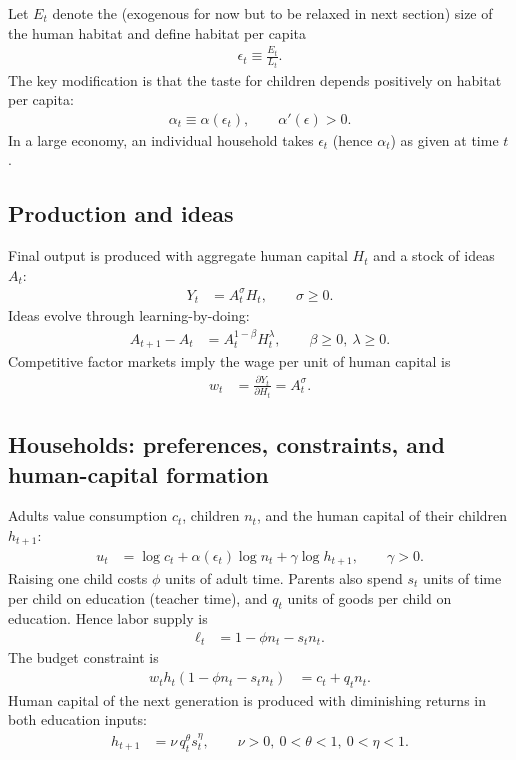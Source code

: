 \documentclass[11pt]{article}
\begin{document}
Let $E_t$ denote the (exogenous for now but to be relaxed in next section) size of the human habitat and define habitat per capita
\begin{align}
\epsilon_t \equiv \frac{E_t}{L_t}. \label{eq:eps_def}
\end{align}
The key modification is that the taste for children depends positively on habitat per capita:
\begin{align}
\alpha_t \equiv \alpha(\epsilon_t),
\qquad
\alpha'(\epsilon)>0. \label{eq:alpha_eps}
\end{align}
In a large economy, an individual household takes $\epsilon_t$ (hence $\alpha_t$) as given at time $t$.

\subsection{Production and ideas}
Final output is produced with aggregate human capital $H_t$ and a stock of ideas $A_t$:
\begin{align}
Y_t &= A_t^{\sigma} H_t, \qquad \sigma \ge 0. \label{eq:Y_hab}
\end{align}
Ideas evolve through learning-by-doing:
\begin{align}
A_{t+1}-A_t &= A_t^{1-\beta} H_t^{\lambda},
\qquad \beta \ge 0,\ \lambda \ge 0. \label{eq:Aiso_hab}
\end{align}
Competitive factor markets imply the wage per unit of human capital is
\begin{align}
w_t &= \frac{\partial Y_t}{\partial H_t}=A_t^{\sigma}. \label{eq:wage_hab}
\end{align}

\subsection{Households: preferences, constraints, and human-capital formation}
Adults value consumption $c_t$, children $n_t$, and the human capital of their children $h_{t+1}$:
\begin{align}
u_t &= \log c_t + \alpha(\epsilon_t)\log n_t + \gamma \log h_{t+1},
\qquad \gamma>0. \label{eq:util_hab}
\end{align}
Raising one child costs $\phi$ units of adult time. Parents also spend $s_t$ units of time per child on education (teacher time),
and $q_t$ units of goods per child on education. Hence labor supply is
\begin{align}
\ell_t &= 1-\phi n_t - s_t n_t. \label{eq:labor_hab}
\end{align}
The budget constraint is
\begin{align}
w_t h_t (1-\phi n_t - s_t n_t) &= c_t + q_t n_t. \label{eq:budget_hab}
\end{align}
Human capital of the next generation is produced with diminishing returns in both education inputs:
\begin{align}
h_{t+1} &= \nu\, q_t^{\theta} s_t^{\eta},
\qquad \nu>0,\ 0<\theta<1,\ 0<\eta<1. \label{eq:hc_hab}
\end{align}
\end{document}
